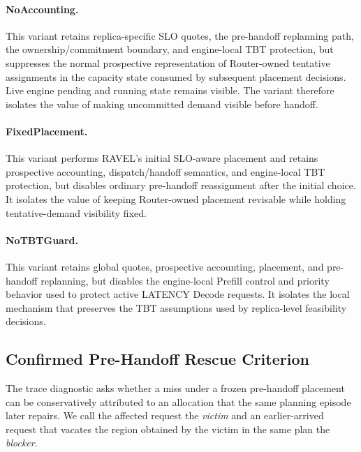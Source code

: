 \documentclass[letterpaper,twocolumn,10pt]{article}
\begin{document}
\paragraph{NoAccounting.}
This variant retains replica-specific SLO quotes, the pre-handoff replanning
path, the ownership/commitment boundary, and engine-local TBT protection, but
suppresses the normal prospective representation of Router-owned tentative
assignments in the capacity state consumed by subsequent placement decisions.
Live engine pending and running state remains visible.
The variant therefore isolates the value of making uncommitted demand visible
before handoff.

\paragraph{FixedPlacement.}
This variant performs RAVEL's initial SLO-aware placement and retains
prospective accounting, dispatch/handoff semantics, and engine-local TBT
protection, but disables ordinary pre-handoff reassignment after the initial
choice.
It isolates the value of keeping Router-owned placement revisable while holding
tentative-demand visibility fixed.

\paragraph{NoTBTGuard.}
This variant retains global quotes, prospective accounting, placement, and
pre-handoff replanning, but disables the engine-local Prefill control and
priority behavior used to protect active LATENCY Decode requests.
It isolates the local mechanism that preserves the TBT assumptions used by
replica-level feasibility decisions.


\subsection{Confirmed Pre-Handoff Rescue Criterion}
\label{sec:appendix:rescue-criterion}

The trace diagnostic asks whether a miss under a frozen pre-handoff placement
can be conservatively attributed to an allocation that the same planning
episode later repairs.
We call the affected request the \emph{victim} and an earlier-arrived request
that vacates the region obtained by the victim in the same plan the
\emph{blocker}.
\end{document}
